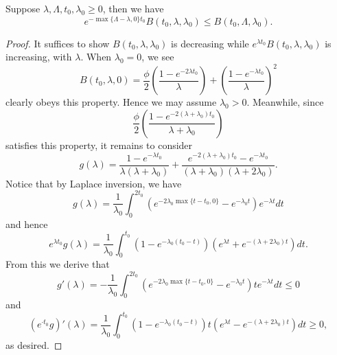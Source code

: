\documentclass[10pt,a4paper]{amsart}
\newcommand{\bb}[1]{\left(#1\right)}
\begin{document}
\begin{lemma}\label{lem:3}
Suppose $\lambda,\Lambda, t_0,\lambda_0 \geq 0$, then we have
\begin{equation}\label{eq:lem3Result}
e^{-\max\{\Lambda-\lambda,0\}t_0}B(t_0,\lambda,\lambda_0)\leq B(t_0,\Lambda,\lambda_0).
\end{equation}
\end{lemma}

\begin{proof}
It suffices to show $B(t_0,\lambda,\lambda_0)$ is decreasing while $e^{\lambda t_0}B(t_0,\lambda,\lambda_0)$ is increasing, with $\lambda$. When $\lambda_0=0$, we see
\begin{equation}\label{eq:B0}
B(t_0,\lambda,0)=\frac{\phi}{2}\bb{\frac{1-e^{-2\lambda t_0}}{\lambda}}+\bb{\frac{1-e^{-\lambda t_0}}{\lambda}}^2
\end{equation}
clearly obeys this property. Hence we may assume $\lambda_0>0$. Meanwhile, since
\begin{equation}\label{eq:FirstTerm}
\frac{\phi}{2}\bb{\frac{1-e^{-2(\lambda+\lambda_0)t_0}}{\lambda+\lambda_0}}
\end{equation}
satisfies this property, it remains to consider
\begin{equation}\label{eq:g}
g(\lambda)=\frac{1-e^{-\lambda t_0}}{\lambda (\lambda+\lambda_0)}+\frac{e^{-2(\lambda+\lambda_0) t_0}-e^{-\lambda t_0}}{(\lambda+\lambda_0)(\lambda+2\lambda_0)}.
\end{equation}
Notice that by Laplace inversion, we have
\begin{equation}\label{eq:LaplaceInversion}
g(\lambda)=\frac{1}{\lambda_0}\int_{0}^{2t_0}\bb{e^{-2\lambda_0 \max\{t-t_0,0\}}-e^{-\lambda_0t}}e^{-\lambda t}dt
\end{equation}
and hence
\begin{equation}\label{eq:gExp}
e^{\lambda t_0}g(\lambda)=\frac{1}{\lambda_0}\int_0^{t_0}(1-e^{-\lambda_0(t_0-t)})(e^{\lambda t}+e^{-(\lambda+2\lambda_0)t})dt.
\end{equation}
From this we derive that
\begin{equation}\label{eq:gDerivative}
g'(\lambda)=-\frac{1}{\lambda_0}\int_{0}^{2t_0}\bb{e^{-2\lambda_0 \max\{t-t_0,0\}}-e^{-\lambda_0t}}te^{-\lambda t}dt\leq 0
\end{equation}
and
\begin{equation}\label{eq:gExpDerivative}
(e^{\cdot t_0}g)'(\lambda)=\frac{1}{\lambda_0}\int_0^{t_0}(1-e^{-\lambda_0(t_0-t)})t(e^{\lambda t}-e^{-(\lambda+2\lambda_0)t})dt\geq 0,
\end{equation}
as desired.
\end{proof}
\end{document}
